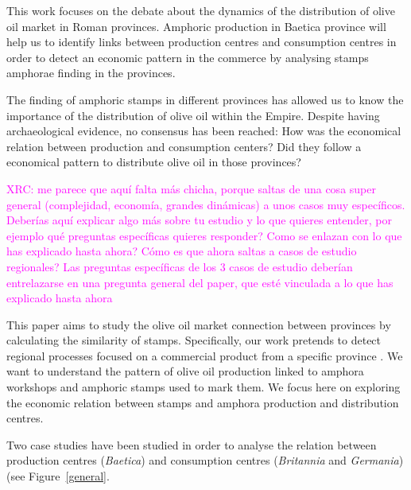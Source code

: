 \documentclass[review]{elsarticle}
\newcommand{\memo}[2]{\textcolor{#1}{#2}}
\newcommand{\xavi}[1]{\memo{magenta}{XRC: #1\\}}
\begin{document}
This work focuses on the debate about the dynamics of the distribution of olive oil market in Roman provinces. Amphoric production in Baetica province will help us to identify links between production centres and consumption centres in order to detect an economic pattern in the commerce by analysing stamps amphorae finding in the provinces. 

The finding of amphoric stamps in different provinces has allowed us to know the importance of the distribution of olive oil within the Empire. Despite having archaeological evidence, no consensus has been reached: How was the economical relation between production and consumption centers? Did they follow a economical pattern to distribute olive oil in those provinces?
  

\xavi{me parece que aquí falta más chicha, porque saltas de una cosa super general (complejidad, economía, grandes dinámicas) a unos casos muy específicos. Deberías aquí explicar algo más sobre tu estudio y lo que quieres entender, por ejemplo qué preguntas específicas quieres responder? Como se enlazan con lo que has explicado hasta ahora? Cómo es que ahora saltas a casos de estudio regionales? Las preguntas específicas de los 3 casos de estudio deberían entrelazarse en una pregunta general del paper, que esté vinculada a lo que has explicado hasta ahora}

This paper aims to study the olive oil market connection between provinces by calculating the similarity of stamps. Specifically, our work pretends to detect regional processes focused on a commercial product from a specific province \citep{isaksen_network_2006}. We want to understand the pattern of olive oil production linked to amphora workshops and amphoric stamps used to mark them. We focus here on exploring the economic relation between stamps and amphora production and distribution centres. 

Two case studies have been studied in order to analyse the relation between production centres (\textit{Baetica}) and consumption centres (\textit{Britannia} and \textit{Germania}) (see Figure~\ref{general}.
\end{document}
